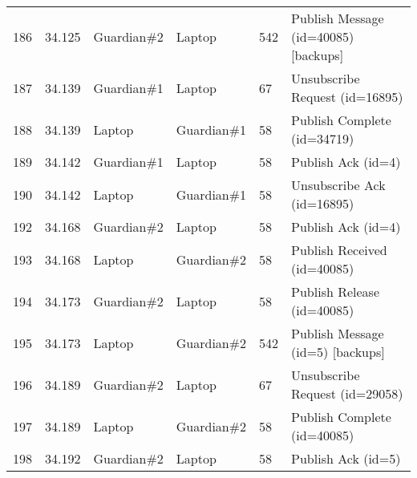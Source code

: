 \begin{table}[]
\begin{tabular}{llllll}
186 & 34.125 & Guardian\#2 & Laptop      & 542    & Publish Message (id=40085) {[}backups{]}                                                                                               \\
187 & 34.139 & Guardian\#1 & Laptop      & 67     & Unsubscribe Request (id=16895)                                                                                                         \\
188 & 34.139 & Laptop      & Guardian\#1 & 58     & Publish Complete (id=34719)                                                                                                            \\
189 & 34.142 & Guardian\#1 & Laptop      & 58     & Publish Ack (id=4)                                                                                                                     \\
190 & 34.142 & Laptop      & Guardian\#1 & 58     & Unsubscribe Ack (id=16895)                                                                                                             \\
192 & 34.168 & Guardian\#2 & Laptop      & 58     & Publish Ack (id=4)                                                                                                                     \\
193 & 34.168 & Laptop      & Guardian\#2 & 58     & Publish Received (id=40085)                                                                                                            \\
194 & 34.173 & Guardian\#2 & Laptop      & 58     & Publish Release (id=40085)                                                                                                             \\
195 & 34.173 & Laptop      & Guardian\#2 & 542    & Publish Message (id=5) {[}backups{]}                                                                                                   \\
196 & 34.189 & Guardian\#2 & Laptop      & 67     & Unsubscribe Request (id=29058)                                                                                                         \\
197 & 34.189 & Laptop      & Guardian\#2 & 58     & Publish Complete (id=40085)                                                                                                            \\
198 & 34.192 & Guardian\#2 & Laptop      & 58     & Publish Ack (id=5)                                                                                                                     \\

\end{tabular}
\end{table}
